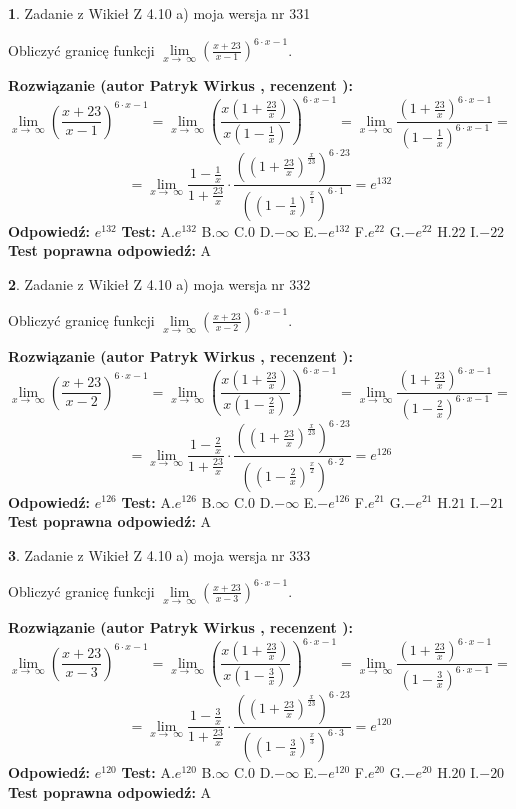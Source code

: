 \documentclass[12pt, a4paper]{article}
\theoremstyle{definition} %
\newtheorem{zad}{}
\newcommand{\zadStart}[1]{\begin{zad}#1\newline}
\newcommand{\zadStop}{\end{zad}}
\newcommand{\rozwStart}[2]{\noindent \textbf{Rozwiązanie (autor #1 , recenzent #2): }\newline}
\newcommand{\rozwStop}{\newline}
\newcommand{\odpStart}{\noindent \textbf{Odpowiedź:}\newline}
\newcommand{\odpStop}{\newline}
\newcommand{\testStart}{\noindent \textbf{Test:}\newline}
\newcommand{\testStop}{\newline}
\newcommand{\kluczStart}{\noindent \textbf{Test poprawna odpowiedź:}\newline}
\newcommand{\kluczStop}{\newline}
\begin{document}
\zadStart{Zadanie z Wikieł Z 4.10 a) moja wersja nr 331}

Obliczyć granicę funkcji  $\lim\limits_{x\to\ \infty}(\frac{x+23}{x-1})^{6\cdot x-1}$.
\zadStop
\rozwStart{Patryk Wirkus}{}
$$\lim\limits_{x\to\ \infty}(\frac{x+23}{x-1})^{6\cdot x-1} = \lim\limits_{x\to\ \infty}(\frac{x(1+\frac{23}{x})}{x(1-\frac{1}{x})})^{6\cdot x-1}=\lim\limits_{x\to\ \infty}\frac{(1+\frac{23}{x})^{6\cdot x-1}}{(1-\frac{1}{x})^{6\cdot x-1}}=$$
$$=\lim\limits_{x\to\ \infty}\frac{1-\frac{1}{x}}{1+\frac{23}{x}}\cdot\frac{((1+\frac{23}{x})^{\frac{x}{23}})^{6\cdot23}}{((1-\frac{1}{x})^{\frac{x}{1}})^{6\cdot1}}=e^{132}$$
\rozwStop
\odpStart
$e^{132}$
\odpStop
\testStart
A.$e^{132}$ B.$\infty$ C.$0$ D.$-\infty$ E.$-e^{132}$
F.$e^{22}$ G.$-e^{22}$
H.$22$
I.$-22$
\testStop
\kluczStart
A
\kluczStop



\zadStart{Zadanie z Wikieł Z 4.10 a) moja wersja nr 332}

Obliczyć granicę funkcji  $\lim\limits_{x\to\ \infty}(\frac{x+23}{x-2})^{6\cdot x-1}$.
\zadStop
\rozwStart{Patryk Wirkus}{}
$$\lim\limits_{x\to\ \infty}(\frac{x+23}{x-2})^{6\cdot x-1} = \lim\limits_{x\to\ \infty}(\frac{x(1+\frac{23}{x})}{x(1-\frac{2}{x})})^{6\cdot x-1}=\lim\limits_{x\to\ \infty}\frac{(1+\frac{23}{x})^{6\cdot x-1}}{(1-\frac{2}{x})^{6\cdot x-1}}=$$
$$=\lim\limits_{x\to\ \infty}\frac{1-\frac{2}{x}}{1+\frac{23}{x}}\cdot\frac{((1+\frac{23}{x})^{\frac{x}{23}})^{6\cdot23}}{((1-\frac{2}{x})^{\frac{x}{2}})^{6\cdot2}}=e^{126}$$
\rozwStop
\odpStart
$e^{126}$
\odpStop
\testStart
A.$e^{126}$ B.$\infty$ C.$0$ D.$-\infty$ E.$-e^{126}$
F.$e^{21}$ G.$-e^{21}$
H.$21$
I.$-21$
\testStop
\kluczStart
A
\kluczStop



\zadStart{Zadanie z Wikieł Z 4.10 a) moja wersja nr 333}

Obliczyć granicę funkcji  $\lim\limits_{x\to\ \infty}(\frac{x+23}{x-3})^{6\cdot x-1}$.
\zadStop
\rozwStart{Patryk Wirkus}{}
$$\lim\limits_{x\to\ \infty}(\frac{x+23}{x-3})^{6\cdot x-1} = \lim\limits_{x\to\ \infty}(\frac{x(1+\frac{23}{x})}{x(1-\frac{3}{x})})^{6\cdot x-1}=\lim\limits_{x\to\ \infty}\frac{(1+\frac{23}{x})^{6\cdot x-1}}{(1-\frac{3}{x})^{6\cdot x-1}}=$$
$$=\lim\limits_{x\to\ \infty}\frac{1-\frac{3}{x}}{1+\frac{23}{x}}\cdot\frac{((1+\frac{23}{x})^{\frac{x}{23}})^{6\cdot23}}{((1-\frac{3}{x})^{\frac{x}{3}})^{6\cdot3}}=e^{120}$$
\rozwStop
\odpStart
$e^{120}$
\odpStop
\testStart
A.$e^{120}$ B.$\infty$ C.$0$ D.$-\infty$ E.$-e^{120}$
F.$e^{20}$ G.$-e^{20}$
H.$20$
I.$-20$
\testStop
\kluczStart
A
\kluczStop
\end{document}
